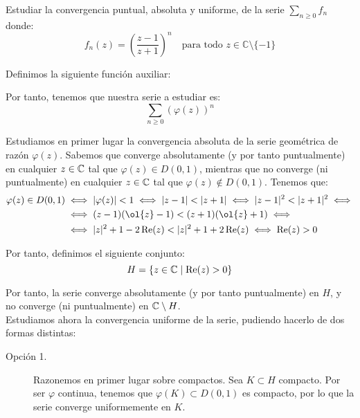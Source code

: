 \begin{ejercicio}
    Estudiar la convergencia puntual, absoluta y uniforme, de la serie $\displaystyle \sum_{n \geq 0} f_n$ donde:
    \[
        f_n(z) = \left(\dfrac{z-1}{z+1}\right)^n \quad \text{para todo } z \in \mathbb{C}\setminus\{-1\}
    \]

        
        Definimos la siguiente función auxiliar:

        Por tanto, tenemos que nuestra serie a estudiar es:
        \begin{equation*}
            \sum_{n \geq 0} \left(\varphi(z)\right)^n
        \end{equation*}

        Estudiamos en primer lugar la convergencia absoluta de la serie geométrica de razón $\varphi(z)$. Sabemos que converge absolutamente (y por tanto puntualmente) en cualquier $z\in \mathbb{C}$ tal que $\varphi(z)\in D(0,1)$, mientras que no converge (ni puntualmente) en cualquier $z\in \mathbb{C}$ tal que $\varphi(z)\notin D(0,1)$. Tenemos que:
        \begin{align*}
            \varphi(z)\in D(0,1) &\iff |\varphi(z)|<1
            \iff |z-1|<|z+1|\iff |z-1|^2<|z+1|^2\iff\\&\iff (z-1)(\ol{z}-1)<(z+1)(\ol{z}+1)
            \iff\\&\iff |z|^2+1 -2\Re(z)<|z|^2+1+2\Re(z)\iff \Re(z)>0
        \end{align*}

        Por tanto, definimos el siguiente conjunto:
        \begin{equation*}
            H = \{z\in \mathbb{C}\mid \operatorname{Re}(z)>0\}
        \end{equation*}

        Por tanto, la serie converge absolutamente (y por tanto puntualmente) en $H$, y no converge (ni puntualmente) en $\mathbb{C}\setminus H$.\\

        Estudiamos ahora la convergencia uniforme de la serie, pudiendo hacerlo de dos formas distintas: 
        \begin{description}
            \item [Opción 1.] 
                Razonemos en primer lugar sobre compactos. Sea $K\subset H$ compacto. Por ser $\varphi$ continua, tenemos que $\varphi(K)\subset D(0,1)$ es compacto, por lo que la serie converge uniformemente en $K$.\\
                

\end{description}
\end{ejercicio}
